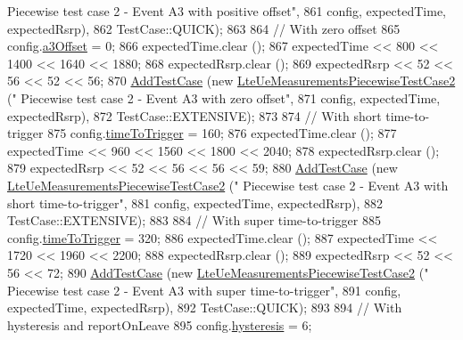 \begin{DoxyCode}
{      Piecewise test case 2 - Event A3 with positive offset"},
861                                                         config, expectedTime, expectedRsrp),
862                TestCase::QUICK);
863 
864   \textcolor{comment}{// With zero offset}
865   config.\hyperlink{structns3_1_1LteRrcSap_1_1ReportConfigEutra_ae3226d3c9ec9988fefee04790ac6c9f6}{a3Offset} = 0;
866   expectedTime.clear ();
867   expectedTime << 800 << 1400 << 1640 << 1880;
868   expectedRsrp.clear ();
869   expectedRsrp << 52 << 56 << 52 << 56;
870   \hyperlink{classns3_1_1TestCase_a3718088e3eefd5d6454569d2e0ddd835}{AddTestCase} (\textcolor{keyword}{new} \hyperlink{classLteUeMeasurementsPiecewiseTestCase2}{LteUeMeasurementsPiecewiseTestCase2} (\textcolor{stringliteral}{"
      Piecewise test case 2 - Event A3 with zero offset"},
871                                                         config, expectedTime, expectedRsrp),
872                TestCase::EXTENSIVE);
873 
874   \textcolor{comment}{// With short time-to-trigger}
875   config.\hyperlink{structns3_1_1LteRrcSap_1_1ReportConfigEutra_aee64b76b166b1beda5bbe1760363ed24}{timeToTrigger} = 160;
876   expectedTime.clear ();
877   expectedTime << 960 << 1560 << 1800 << 2040;
878   expectedRsrp.clear ();
879   expectedRsrp << 52 << 56 << 56 << 59;
880   \hyperlink{classns3_1_1TestCase_a3718088e3eefd5d6454569d2e0ddd835}{AddTestCase} (\textcolor{keyword}{new} \hyperlink{classLteUeMeasurementsPiecewiseTestCase2}{LteUeMeasurementsPiecewiseTestCase2} (\textcolor{stringliteral}{"
      Piecewise test case 2 - Event A3 with short time-to-trigger"},
881                                                         config, expectedTime, expectedRsrp),
882                TestCase::EXTENSIVE);
883 
884   \textcolor{comment}{// With super time-to-trigger}
885   config.\hyperlink{structns3_1_1LteRrcSap_1_1ReportConfigEutra_aee64b76b166b1beda5bbe1760363ed24}{timeToTrigger} = 320;
886   expectedTime.clear ();
887   expectedTime << 1720 << 1960 << 2200;
888   expectedRsrp.clear ();
889   expectedRsrp << 52 << 56 << 72;
890   \hyperlink{classns3_1_1TestCase_a3718088e3eefd5d6454569d2e0ddd835}{AddTestCase} (\textcolor{keyword}{new} \hyperlink{classLteUeMeasurementsPiecewiseTestCase2}{LteUeMeasurementsPiecewiseTestCase2} (\textcolor{stringliteral}{"
      Piecewise test case 2 - Event A3 with super time-to-trigger"},
891                                                         config, expectedTime, expectedRsrp),
892                TestCase::QUICK);
893 
894   \textcolor{comment}{// With hysteresis and reportOnLeave}
895   config.\hyperlink{structns3_1_1LteRrcSap_1_1ReportConfigEutra_a1fb9169ea261ba20af6a0c18fcc04fa9}{hysteresis} = 6;

\end{DoxyCode}

